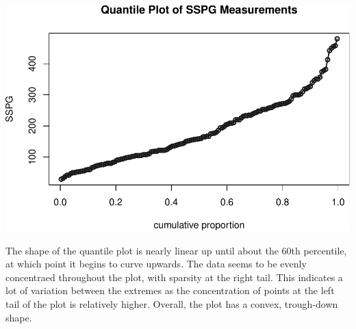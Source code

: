 \documentclass[9pt,letter]{article}
\newenvironment{Shaded}{\begin{snugshade}}{\end{snugshade}}
\newcommand{\KeywordTok}[1]{\textcolor[rgb]{0.13,0.29,0.53}{\textbf{#1}}}
\newcommand{\DataTypeTok}[1]{\textcolor[rgb]{0.13,0.29,0.53}{#1}}
\newcommand{\DecValTok}[1]{\textcolor[rgb]{0.00,0.00,0.81}{#1}}
\newcommand{\StringTok}[1]{\textcolor[rgb]{0.31,0.60,0.02}{#1}}
\newcommand{\CommentTok}[1]{\textcolor[rgb]{0.56,0.35,0.01}{\textit{#1}}}
\newcommand{\OperatorTok}[1]{\textcolor[rgb]{0.81,0.36,0.00}{\textbf{#1}}}
\newcommand{\NormalTok}[1]{#1}
\begin{document}
\begin{Shaded}
\end{Shaded}

\includegraphics{a4_testing_files/figure-latex/unnamed-chunk-4-1.pdf}

The shape of the quantile plot is nearly linear up until about the 60th
percentile, at which point it begins to curve upwards. The data seems to
be evenly concentraed throughout the plot, with sparsity at the right
tail. This indicates a lot of variation between the extremes as the
concentration of points at the left tail of the plot is relatively
higher. Overall, the plot has a convex, trough-down shape.

\item 
\end{document}

